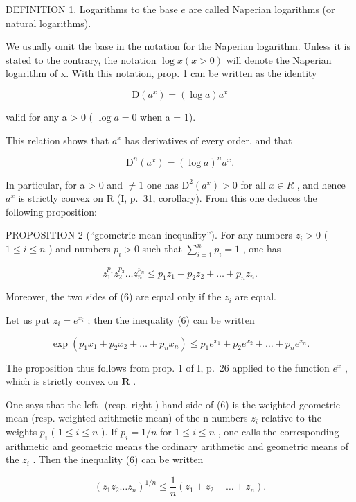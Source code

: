 DEFINITION 1. Logarithms to the base \(e\) are called Naperian logarithms (or natural logarithms).

We usually omit the base in the notation for the Naperian logarithm. Unless it is stated to the contrary, the notation \(\log x (x > 0)\) will denote the Naperian logarithm of x. With this notation, prop. 1 can be written as the identity

\[
\mathrm{D} \left(a ^ {x}\right) = (\log a) a ^ {x}\tag{4}
\]

valid for any a \textgreater{} 0 ( \(\log a = 0\) when a = 1).

This relation shows that \(a^x\) has derivatives of every order, and that

\[
\mathrm{D} ^ {n} \left(a ^ {x}\right) = (\log a) ^ {n} a ^ {x}.\tag{5}
\]

In particular, for a \textgreater{} 0 and \(\neq 1\) one has \(\mathrm{D}^{2}(a^{x}) > 0\) for all \(x \in R\) , and hence \(a^{x}\) is strictly convex on R (I, p.~31, corollary). From this one deduces the following proposition:

PROPOSITION 2 (``geometric mean inequality''). For any numbers \(z_{i} > 0\) ( \(1 \leqslant i \leqslant n\) ) and numbers \(p_{i} > 0\) such that \(\sum_{i=1}^{n} p_{i} = 1\) , one has

\[
z _ {1} ^ {p _ {1}} z _ {2} ^ {p _ {2}} \dots z _ {n} ^ {p _ {n}} \leqslant p _ {1} z _ {1} + p _ {2} z _ {2} + \dots + p _ {n} z _ {n}.\tag{6}
\]

Moreover, the two sides of (6) are equal only if the \(z_{i}\) are equal.

Let us put \(z_{i} = e^{x_{i}}\) ; then the inequality (6) can be written

\[
\exp \left(p _ {1} x _ {1} + p _ {2} x _ {2} + \dots + p _ {n} x _ {n}\right) \leqslant p _ {1} e ^ {x _ {1}} + p _ {2} e ^ {x _ {2}} + \dots + p _ {n} e ^ {x _ {n}}.\tag{7}
\]

The proposition thus follows from prop. 1 of I, p.~26 applied to the function \(e^x\) , which is strictly convex on \(\mathbf{R}\) .

One says that the left- (resp. right-) hand side of (6) is the weighted geometric mean (resp. weighted arithmetic mean) of the n numbers \(z_{i}\) relative to the weights \(p_{i}\) ( \(1 \leqslant i \leqslant n\) ). If \(p_{i} = 1/n\) for \(1 \leqslant i \leqslant n\) , one calls the corresponding arithmetic and geometric means the ordinary arithmetic and geometric means of the \(z_{i}\) . Then the inequality (6) can be written

\[
\left(z _ {1} z _ {2} \dots z _ {n}\right) ^ {1 / n} \leqslant \frac {1}{n} \left(z _ {1} + z _ {2} + \dots + z _ {n}\right).\tag{8}
\]

